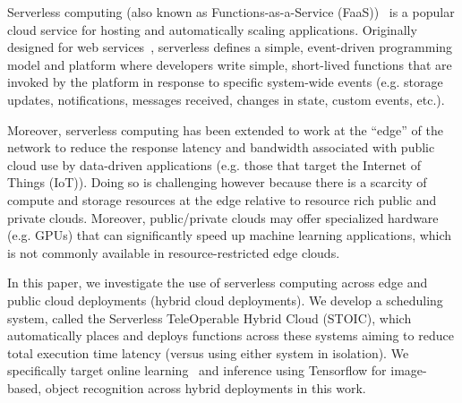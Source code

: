 Serverless computing (also known as Functions-as-a-Ser\-vice
(FaaS))~\cite{ref:aws-lambda,ref:faas3,ref:afunctions-16} is a popular cloud
service for hosting and automatically scaling applications. Originally
designed for web
services~\cite{ref:lambda-webservices,ref:lambda-microservices}, serverless
defines a simple, event-driven programming model and platform where
developers write simple, short-lived functions that are invoked by the
platform in response to specific system-wide events (e.g. storage updates,
notifications, messages received, changes in state, custom events, etc.). 


Moreover, serverless computing has been extended to work at the ``edge'' of
the network to reduce the response latency and bandwidth associated with
public cloud use by data-driven applications (e.g.  those that target the
Internet of Things (IoT)). Doing so is challenging however because there is a
scarcity of compute and storage resources at the edge relative to resource
rich public and private clouds. Moreover, public/private clouds may offer
specialized hardware (e.g. GPUs) that can significantly speed up machine
learning applications, which is not commonly available in resource-restricted
edge clouds.

In this paper, we investigate the use of serverless computing across edge and
public cloud deployments (hybrid cloud deployments). We develop a scheduling
system, called the Serverless TeleOperable Hybrid Cloud (STOIC), which
automatically places and deploys functions across these systems aiming to
reduce total execution time latency (versus using either system in isolation).
We specifically target online learning~\cite{ref:onlinelearning} and inference
using Tensorflow for image-based, object recognition across hybrid deployments
in this work.

